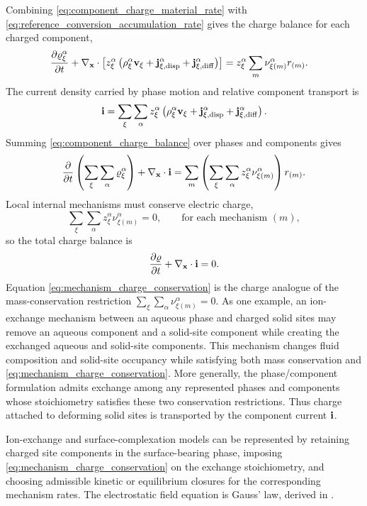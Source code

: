 Combining \eqref{eq:component_charge_material_rate} with
\eqref{eq:reference_conversion_accumulation_rate} gives the charge balance for
each charged component,
%
\begin{align}
	\frac{\partial\varrho_\xi^\alpha}{\partial t}
	+
	\nabla_{\mathbf{x}}\cdot
	\left[
	z_\xi^\alpha
	\left(
	\rho_\xi^\alpha\mathbf{v}_\xi
	+
	\mathbf{j}_{\xi,{\rm disp}}^\alpha
	+
	\mathbf{j}_{\xi,{\rm diff}}^\alpha
	\right)
	\right]
	&=
	z_\xi^\alpha
	\sum_m\nu_{\xi (m)}^\alpha r_{(m)} .
	\label{eq:component_charge_balance}
\end{align}
%
The current density carried by phase motion and relative component transport is
%
\begin{equation}
	\mathbf{i}
	=
	\sum_\xi\sum_\alpha
	z_\xi^\alpha
	\left(
	\rho_\xi^\alpha\mathbf{v}_\xi
	+
	\mathbf{j}_{\xi,{\rm disp}}^\alpha
	+
	\mathbf{j}_{\xi,{\rm diff}}^\alpha
	\right).
	\label{eq:charge_current_density_definition}
\end{equation}
%
Summing \eqref{eq:component_charge_balance} over phases and components gives
%
\begin{align}
	\frac{\partial}{\partial t}
	\left(
	\sum_\xi\sum_\alpha\varrho_\xi^\alpha
	\right)
	+
	\nabla_{\mathbf{x}}\cdot\mathbf{i}
	=
	\sum_m
	\left(
	\sum_\xi\sum_\alpha
	z_\xi^\alpha\nu_{\xi (m)}^\alpha
	\right)
	r_{(m)} .
	\label{eq:mixture_charge_balance_with_sources}
\end{align}
%
Local internal mechanisms must conserve electric charge,
%
\begin{equation}
	\sum_\xi\sum_\alpha
	z_\xi^\alpha\nu_{\xi (m)}^\alpha
	=0,
	\qquad
	\text{for each mechanism }(m),
	\label{eq:mechanism_charge_conservation}
\end{equation}
%
so the total charge balance is
%
\begin{equation}
	\frac{\partial\varrho}{\partial t}
	+
	\nabla_{\mathbf{x}}\cdot\mathbf{i}
	= 0.
	\label{eq:mixture_charge_balance}
\end{equation}
%
Equation \eqref{eq:mechanism_charge_conservation} is the charge analogue of the
mass-conservation restriction
\(\sum_\xi\sum_\alpha\nu_{\xi (m)}^\alpha=0\).  As one example, an ion-exchange
mechanism between an aqueous phase and charged solid sites may remove an aqueous
component and a solid-site component while creating the exchanged aqueous and
solid-site components.  This mechanism changes fluid composition and solid-site
occupancy while satisfying both mass conservation and
\eqref{eq:mechanism_charge_conservation}.  More generally, the phase/component
formulation admits exchange among any represented phases and components whose
stoichiometry satisfies these two conservation restrictions.  Thus charge
attached to deforming solid sites is transported by the component current
\(\mathbf{i}\).

Ion-exchange and surface-complexation models can be represented by retaining
charged site components in the surface-bearing phase, imposing
\eqref{eq:mechanism_charge_conservation} on the exchange stoichiometry, and
choosing admissible kinetic or equilibrium closures for the corresponding
mechanism rates.  The electrostatic field equation is Gauss' law, derived in
.
